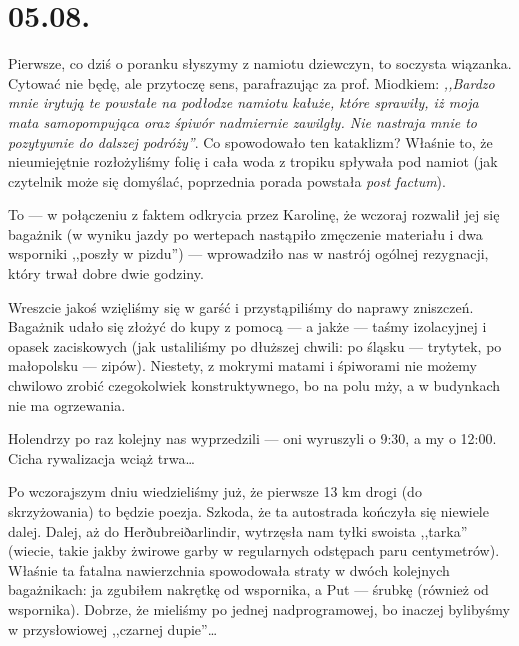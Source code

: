 \chapter*{05.08.}

Pierwsze, co dziś o poranku słyszymy z namiotu dziewczyn, to soczysta wiązanka. Cytować nie będę, ale przytoczę sens, parafrazując za prof. Miodkiem: \emph{,,Bardzo mnie irytują te powstałe na podłodze namiotu kałuże, które sprawiły, iż moja mata samopompująca oraz śpiwór nadmiernie zawilgły. Nie nastraja mnie to pozytywnie do dalszej podróży''}. Co spowodowało ten kataklizm? Właśnie to, że nieumiejętnie rozłożyliśmy folię i cała woda z tropiku spływała pod namiot (jak czytelnik może się domyślać, poprzednia porada powstała \textit{post factum}).

To --- w połączeniu z faktem odkrycia przez Karolinę, że wczoraj rozwalił jej się bagażnik (w wyniku jazdy po wertepach nastąpiło zmęczenie materiału i dwa wsporniki ,,poszły w pizdu'') --- wprowadziło nas w nastrój ogólnej rezygnacji, który trwał dobre dwie godziny.

Wreszcie jakoś wzięliśmy się w garść i przystąpiliśmy do naprawy zniszczeń. Bagażnik udało się złożyć do kupy z pomocą --- a jakże --- taśmy izolacyjnej i opasek zaciskowych (jak ustaliliśmy po dłuższej chwili: po śląsku --- trytytek, po małopolsku --- zipów). Niestety, z mokrymi matami i śpiworami nie możemy chwilowo zrobić czegokolwiek konstruktywnego, bo na polu mży, a w budynkach nie ma ogrzewania.

Holendrzy po raz kolejny nas wyprzedzili --- oni wyruszyli o 9:30, a my o 12:00. Cicha rywalizacja wciąż trwa…

Po wczorajszym dniu wiedzieliśmy już, że pierwsze 13 km drogi (do skrzyżowania) to będzie poezja. Szkoda, że ta autostrada kończyła się niewiele dalej. Dalej, aż do Herðubreiðarlindir, wytrzęsła nam tyłki swoista ,,tarka'' (wiecie, takie jakby żwirowe garby w regularnych odstępach paru centymetrów). Właśnie ta fatalna nawierzchnia spowodowała straty w dwóch kolejnych bagażnikach: ja zgubiłem nakrętkę od wspornika, a Put --- śrubkę (również od wspornika). Dobrze, że mieliśmy po jednej nadprogramowej, bo inaczej bylibyśmy w przysłowiowej ,,czarnej dupie''…



